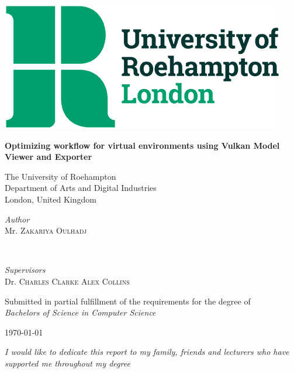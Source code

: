 \documentclass[11pt]{article}
\begin{document}
\begin{titlepage}
	\centering
  \includegraphics[scale=0.35]{images/university-logo.png}\par
  \vspace{1cm}
	{\huge\textbf{Optimizing workflow for virtual environments using Vulkan Model Viewer and Exporter}\par}
  \vspace{1cm}
  The University of Roehampton\\
  Department of Arts and Digital Industries\\
  London, United Kingdom
  \vspace{1cm}
  \vfill
  \begin{minipage}[t]{0.4\textwidth}
		\begin{flushleft}
			\large
			\textit{Author}\\
			Mr. \textsc{Zakariya Oulhadj} %
		\end{flushleft}
	\end{minipage}
	~
	\begin{minipage}[t]{0.4\textwidth}
		\begin{flushright}
			\large
			\textit{Supervisors}\\
			Dr. \textsc{Charles Clarke} %
      \textsc{Alex Collins} %
		\end{flushright}
	\end{minipage}

  \vfill
  Submitted in partial fulfillment of the requirements for the degree of \\
  \textit{Bachelors of Science in Computer Science}
  \vfill
	{\large \today\par}
\end{titlepage}

\pagebreak
\pagestyle{empty}


\begin{center}
\thispagestyle{empty}  
\vspace*{\fill}
\textit{I would like to dedicate this report to my family, friends and lecturers who have supported me throughout my degree}
\vspace*{\fill}
\end{center}
\end{document}
